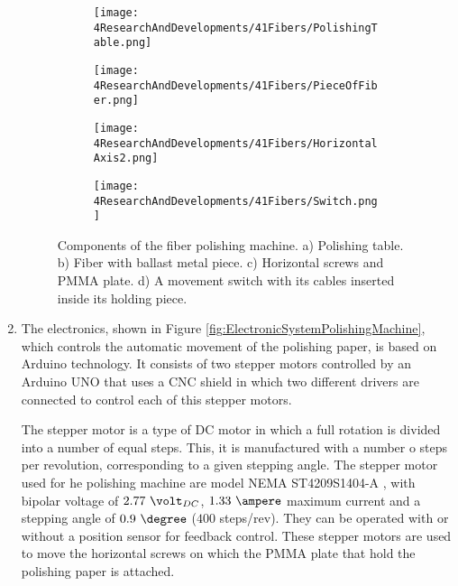 \begin{enumerate}
\begin{figure}
\centering
    \begin{subfigure}[b]{0.55\textwidth}
    \centering
    \texttt{[image: 4ResearchAndDevelopments/41Fibers/PolishingTable.png]}  
    \caption{\label{subfig:PolishingTable}}
    \end{subfigure}
    \hfill
    \begin{subfigure}[b]{0.3\textwidth}
    \centering
    \texttt{[image: 4ResearchAndDevelopments/41Fibers/PieceOfFiber.png]}  
    \caption{\label{subfig:FiberMetailcPiece}}
    \end{subfigure}
    \hfill
    \begin{subfigure}[b]{0.55\textwidth}
    \centering
    \texttt{[image: 4ResearchAndDevelopments/41Fibers/HorizontalAxis2.png]}  
    \caption{\label{subfig:HorizontalAxis}}
    \end{subfigure}
    \hfill
    \begin{subfigure}[b]{0.4\textwidth}
    \centering
    \texttt{[image: 4ResearchAndDevelopments/41Fibers/Switch.png]}  
    \caption{\label{subfig:3DSwitchPiece}}
    \end{subfigure}
 \caption{Components of the fiber polishing machine. a) Polishing table. b) Fiber with ballast metal piece. c) Horizontal screws and PMMA plate. d) A movement switch with its cables inserted inside its holding piece.}
 \label{fig:PolishingTable}
\end{figure}

\item{} The electronics, shown in Figure \ref{fig:ElectronicSystemPolishingMachine}, which controls the automatic movement of the polishing paper, is based on Arduino technology. It consists of two stepper motors controlled by an Arduino UNO \cite{ArduinoUNO} that uses a CNC shield \cite{CNCShield} in which two different drivers are connected to control each of this stepper motors.


The stepper motor is a type of DC motor in which a full rotation is divided into a number of equal steps. This, it is manufactured with a number o steps per revolution, corresponding to a given stepping angle. The stepper motor used for he polishing machine are model NEMA ST4209S1404-A \cite{StepperMotors}, with bipolar voltage of $2.77~\volt_{DC}$, $1.33~\ampere$ maximum current and a stepping angle of $0.9~\degree$ ($400$ steps/rev). They can be operated with or without a position sensor for feedback control. These stepper motors are used to move the horizontal screws on which the PMMA plate that hold the polishing paper is attached.


\end{enumerate}

